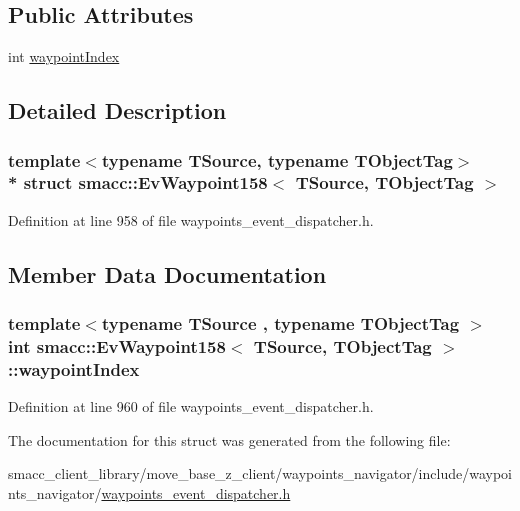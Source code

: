 \subsection*{Public Attributes}
\begin{DoxyCompactItemize}
\item 
int \hyperlink{structsmacc_1_1EvWaypoint158_addd13bdd45539c93a3c215c39550920a}{waypoint\+Index}
\end{DoxyCompactItemize}


\subsection{Detailed Description}
\subsubsection*{template$<$typename T\+Source, typename T\+Object\+Tag$>$\\*
struct smacc\+::\+Ev\+Waypoint158$<$ T\+Source, T\+Object\+Tag $>$}



Definition at line 958 of file waypoints\+\_\+event\+\_\+dispatcher.\+h.



\subsection{Member Data Documentation}
\subsubsection[{\texorpdfstring{waypoint\+Index}{waypointIndex}}]{\setlength{\rightskip}{0pt plus 5cm}template$<$typename T\+Source , typename T\+Object\+Tag $>$ int {\bf smacc\+::\+Ev\+Waypoint158}$<$ T\+Source, T\+Object\+Tag $>$\+::waypoint\+Index}\hypertarget{structsmacc_1_1EvWaypoint158_addd13bdd45539c93a3c215c39550920a}{}\label{structsmacc_1_1EvWaypoint158_addd13bdd45539c93a3c215c39550920a}


Definition at line 960 of file waypoints\+\_\+event\+\_\+dispatcher.\+h.



The documentation for this struct was generated from the following file\+:\begin{DoxyCompactItemize}
\item 
smacc\+\_\+client\+\_\+library/move\+\_\+base\+\_\+z\+\_\+client/waypoints\+\_\+navigator/include/waypoints\+\_\+navigator/\hyperlink{waypoints__event__dispatcher_8h}{waypoints\+\_\+event\+\_\+dispatcher.\+h}\end{DoxyCompactItemize}
